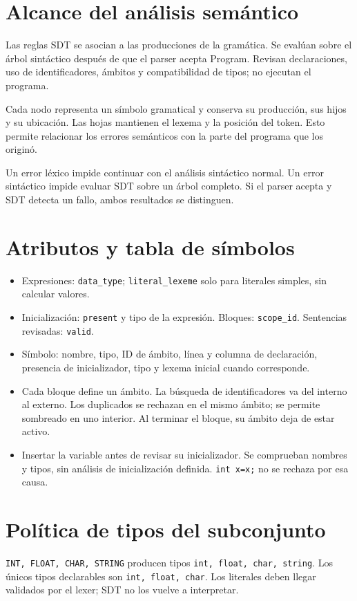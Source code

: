 

\section*{Alcance del análisis semántico}
Las reglas SDT se asocian a las producciones de la gramática. Se evalúan sobre el árbol sintáctico después de que el parser acepta Program. Revisan declaraciones, uso de identificadores, ámbitos y compatibilidad de tipos; no ejecutan el programa.

Cada nodo representa un símbolo gramatical y conserva su producción, sus hijos y su ubicación. Las hojas mantienen el lexema y la posición del token. Esto permite relacionar los errores semánticos con la parte del programa que los originó.

Un error léxico impide continuar con el análisis sintáctico normal. Un error sintáctico impide evaluar SDT sobre un árbol completo. Si el parser acepta y SDT detecta un fallo, ambos resultados se distinguen.
\section*{Atributos y tabla de símbolos}
\begin{itemize}
\item Expresiones: \texttt{data\_type}; \texttt{literal\_lexeme} solo para literales simples, sin calcular valores.
\item Inicialización: \texttt{present} y tipo de la expresión. Bloques: \texttt{scope\_id}. Sentencias revisadas: \texttt{valid}.
\item Símbolo: nombre, tipo, ID de ámbito, línea y columna de declaración, presencia de inicializador, tipo y lexema inicial cuando corresponde.
\item Cada bloque define un ámbito. La búsqueda de identificadores va del interno al externo. Los duplicados se rechazan en el mismo ámbito; se permite sombreado en uno interior. Al terminar el bloque, su ámbito deja de estar activo.
\item Insertar la variable antes de revisar su inicializador. Se comprueban nombres y tipos, sin análisis de inicialización definida. \texttt{int x=x;} no se rechaza por esa causa.
\end{itemize}
\section*{Política de tipos del subconjunto}
\texttt{INT, FLOAT, CHAR, STRING} producen tipos \texttt{int, float, char, string}. Los únicos tipos declarables son \texttt{int, float, char}. Los literales deben llegar validados por el lexer; SDT no los vuelve a interpretar.

